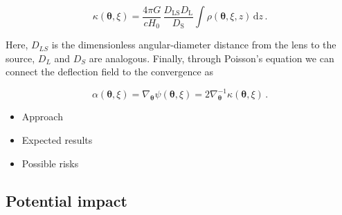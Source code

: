 \documentclass[a4paper,10pt]{article}
\begin{document}
\begin{equation}
\label{eq:thinlens}
  \kappa(\bm\theta,\xi) = \frac{4\pi G}{cH_0}\, \frac{D_\mathrm{LS}D_\mathrm{L}}{D_\mathrm{S}} \int \rho(\bm\theta,\xi,z)\,\mathrm{d}z \,.
\end{equation}

Here, \(D_{LS}\) is the dimensionless angular-diameter distance from the
lens to the source, \(D_L\) and \(D_S\) are analogous.  Finally, through
Poisson's equation we can connect the deflection field to the convergence as

\begin{equation}
  \alpha(\bm\theta,\xi) = \nabla_{\bm\theta}\psi(\bm\theta,\xi) = 2\nabla_{\bm\theta}^{-1}\kappa(\bm\theta,\xi) \,.
\end{equation}


\begin{itemize}
\item Approach
\item Expected results
\item Possible risks
\end{itemize}


\subsection*{Potential impact}
\label{sec:orge951a1c}





\end{document}
